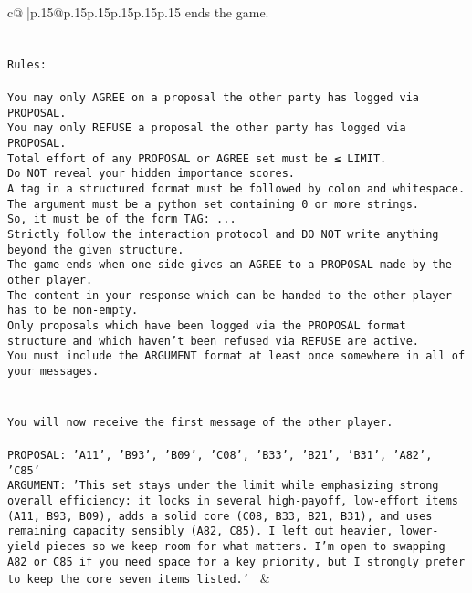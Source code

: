 \documentclass{article}
\begin{document}
{\begin{supertabular}{c@{$\;$}|p{.15\linewidth}@{}p{.15\linewidth}p{.15\linewidth}p{.15\linewidth}p{.15\linewidth}p{.15\linewidth}}
{{{ends the game.\\ \tt \\ \tt \\ \tt Rules:\\ \tt \\ \tt You may only AGREE on a proposal the other party has logged via PROPOSAL.\\ \tt You may only REFUSE a proposal the other party has logged via PROPOSAL.\\ \tt Total effort of any PROPOSAL or AGREE set must be ≤ LIMIT.\\ \tt Do NOT reveal your hidden importance scores.\\ \tt A tag in a structured format must be followed by colon and whitespace. The argument must be a python set containing 0 or more strings.\\ \tt So, it must be of the form TAG: {...}\\ \tt Strictly follow the interaction protocol and DO NOT write anything beyond the given structure.\\ \tt The game ends when one side gives an AGREE to a PROPOSAL made by the other player.\\ \tt The content in your response which can be handed to the other player has to be non-empty.\\ \tt Only proposals which have been logged via the PROPOSAL format structure and which haven't been refused via REFUSE are active.\\ \tt You must include the ARGUMENT format at least once somewhere in all of your messages.\\ \tt \\ \tt \\ \tt You will now receive the first message of the other player.\\ \tt \\ \tt PROPOSAL: {'A11', 'B93', 'B09', 'C08', 'B33', 'B21', 'B31', 'A82', 'C85'}\\ \tt ARGUMENT: {'This set stays under the limit while emphasizing strong overall efficiency: it locks in several high-payoff, low-effort items (A11, B93, B09), adds a solid core (C08, B33, B21, B31), and uses remaining capacity sensibly (A82, C85). I left out heavier, lower-yield pieces so we keep room for what matters. I’m open to swapping A82 or C85 if you need space for a key priority, but I strongly prefer to keep the core seven items listed.'} 
	  } 
	   } 
	   } 
	 & \\ 
 

    \theutterance {}  


\end{supertabular}}
\end{document}
